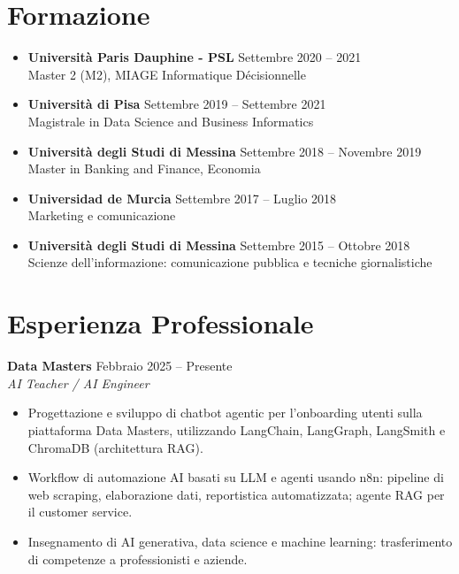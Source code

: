 \documentclass[11pt,a4paper]{article}
\begin{document}
\section{Formazione}
\begin{itemize}[leftmargin=*, nosep]
    \item \textbf{Universit\`{a} Paris Dauphine - PSL} \hfill Settembre 2020 -- 2021\\
    Master 2 (M2), MIAGE Informatique D\'{e}cisionnelle

    \item \textbf{Universit\`{a} di Pisa} \hfill Settembre 2019 -- Settembre 2021\\
    Magistrale in Data Science and Business Informatics

    \item \textbf{Universit\`{a} degli Studi di Messina} \hfill Settembre 2018 -- Novembre 2019\\
    Master in Banking and Finance, Economia

    \item \textbf{Universidad de Murcia} \hfill Settembre 2017 -- Luglio 2018\\
    Marketing e comunicazione

    \item \textbf{Universit\`{a} degli Studi di Messina} \hfill Settembre 2015 -- Ottobre 2018\\
    Scienze dell'informazione: comunicazione pubblica e tecniche giornalistiche
\end{itemize}

\section{Esperienza Professionale}

\textbf{Data Masters} \hfill Febbraio 2025 -- Presente\\
\textit{AI Teacher / AI Engineer}
\begin{itemize}[leftmargin=*, nosep]
    \item Progettazione e sviluppo di chatbot agentic per l'onboarding utenti sulla piattaforma Data Masters, utilizzando LangChain, LangGraph, LangSmith e ChromaDB (architettura RAG).
    \item Workflow di automazione AI basati su LLM e agenti usando n8n: pipeline di web scraping, elaborazione dati, reportistica automatizzata; agente RAG per il customer service.
    \item Insegnamento di AI generativa, data science e machine learning: trasferimento di competenze a professionisti e aziende.
\end{itemize}
\end{document}
